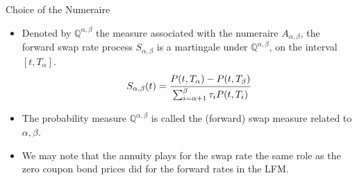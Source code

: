\documentclass{beamer}
\begin{document}
\begin{frame}{Choice of the Numeraire}
	\begin{itemize}
		\item<1-> Denoted by $\mathbb{Q}^{\alpha,\beta}$ the measure associated with the numeraire $A_{\alpha,\beta}$, the forward swap rate process $S_{\alpha,\beta}$ is a martingale under $\mathbb{Q}^{\alpha,\beta}$, on the interval $[t, T_\alpha]$.
		\begin{equation*}
			S_{\alpha,\beta}(t) = \cfrac{P(t,T_\alpha)-P(t,T_\beta)}{\sum_{i=\alpha+1}^{\beta}\tau_iP(t,T_i)}
		\end{equation*}
		\item<2-> The probability measure $\mathbb{Q}^{\alpha,\beta}$ is called \textcolor{maincolor}{the (forward) swap measure} related to $\alpha, \beta$.
		\item<2-> We may note that the annuity plays for the swap rate the same role as the zero coupon bond prices did for the forward rates in the LFM.
	\end{itemize}
\end{frame}
\end{document}
